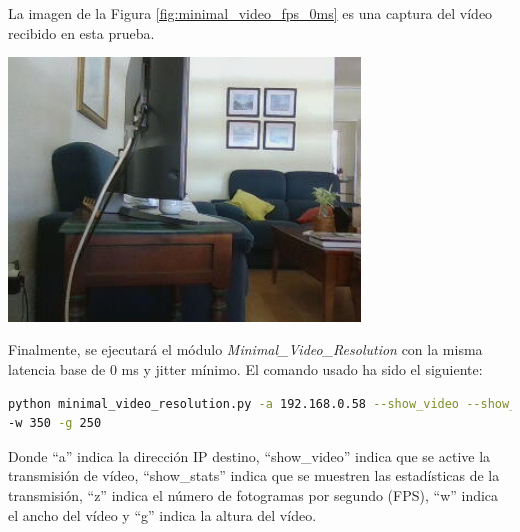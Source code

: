 \newpage
La imagen de la Figura \ref{fig:minimal_video_fps_0ms} es una captura del vídeo recibido en esta prueba.
\begin{center}
  \includegraphics[width = 0.7\textwidth]{images/VideoRecibido4.2.png}
  \label{fig:minimal_video_fps_0ms}
\end{center}
\newpage

Finalmente, se ejecutará el módulo \textit{Minimal\_Video\_Resolution} con la misma latencia base de 0 ms y jitter mínimo. El comando usado ha sido el siguiente:

\begin{lstlisting}[language=bash,basicstyle=\ttfamily\scriptsize]
python minimal_video_resolution.py -a 192.168.0.58 --show_video --show_stats -z 12 \\
-w 350 -g 250
\end{lstlisting}
Donde ``a'' indica la dirección IP destino, ``show\_video'' indica que se active la transmisión de vídeo, ``show\_stats'' indica que se muestren las estadísticas de la transmisión, ``z'' indica el número de fotogramas por segundo (FPS), ``w'' indica el ancho del vídeo y ``g'' indica la altura del vídeo.
\vspace{\baselineskip}

